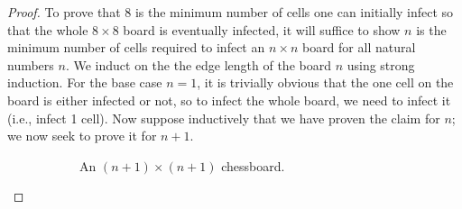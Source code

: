\documentclass[../main.tex]{subfiles}
\begin{document}
\begin{enumerate}
    \begin{proof}
        To prove that 8 is the minimum number of cells one can initially infect so that the whole $8\times 8$ board is eventually infected, it will suffice to show $n$ is the minimum number of cells required to infect an $n\times n$ board for all natural numbers $n$. We induct on the the edge length of the board $n$ using strong induction. For the base case $n=1$, it is trivially obvious that the one cell on the board is either infected or not, so to infect the whole board, we need to infect it (i.e., infect 1 cell). Now suppose inductively that we have proven the claim for $n$; we now seek to prove it for $n+1$.\par
        \begin{figure}[h!]
            \centering
            \begin{subfigure}[b]{0.3\linewidth}
                \centering
                \caption{An $(n+1)\times(n+1)$ chessboard.}
                \label{fig:chessboarda}
            \end{subfigure}
            \begin{subfigure}[b]{0.3\linewidth}
                \centering
\end{subfigure}
\end{figure}
\end{proof}
\end{enumerate}
\end{document}
